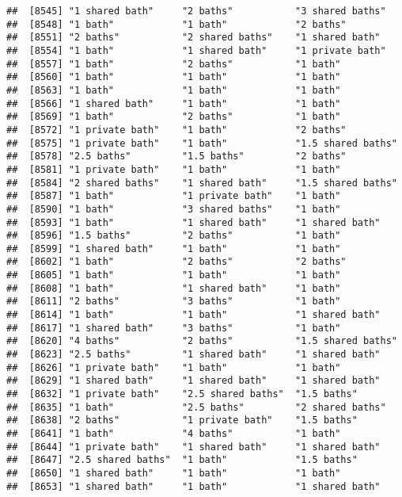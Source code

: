 \documentclass[
]{article}
\begin{document}
\begin{verbatim}
##  [8545] "1 shared bath"     "2 baths"           "3 shared baths"   
##  [8548] "1 bath"            "1 bath"            "2 baths"          
##  [8551] "2 baths"           "2 shared baths"    "1 shared bath"    
##  [8554] "1 bath"            "1 shared bath"     "1 private bath"   
##  [8557] "1 bath"            "2 baths"           "1 bath"           
##  [8560] "1 bath"            "1 bath"            "1 bath"           
##  [8563] "1 bath"            "1 bath"            "1 bath"           
##  [8566] "1 shared bath"     "1 bath"            "1 bath"           
##  [8569] "1 bath"            "2 baths"           "1 bath"           
##  [8572] "1 private bath"    "1 bath"            "2 baths"          
##  [8575] "1 private bath"    "1 bath"            "1.5 shared baths" 
##  [8578] "2.5 baths"         "1.5 baths"         "2 baths"          
##  [8581] "1 private bath"    "1 bath"            "1 bath"           
##  [8584] "2 shared baths"    "1 shared bath"     "1.5 shared baths" 
##  [8587] "1 bath"            "1 private bath"    "1 bath"           
##  [8590] "1 bath"            "3 shared baths"    "1 bath"           
##  [8593] "1 bath"            "1 shared bath"     "1 shared bath"    
##  [8596] "1.5 baths"         "2 baths"           "1 bath"           
##  [8599] "1 shared bath"     "1 bath"            "1 bath"           
##  [8602] "1 bath"            "2 baths"           "2 baths"          
##  [8605] "1 bath"            "1 bath"            "1 bath"           
##  [8608] "1 bath"            "1 shared bath"     "1 bath"           
##  [8611] "2 baths"           "3 baths"           "1 bath"           
##  [8614] "1 bath"            "1 bath"            "1 shared bath"    
##  [8617] "1 shared bath"     "3 baths"           "1 bath"           
##  [8620] "4 baths"           "2 baths"           "1.5 shared baths" 
##  [8623] "2.5 baths"         "1 shared bath"     "1 shared bath"    
##  [8626] "1 private bath"    "1 bath"            "1 bath"           
##  [8629] "1 shared bath"     "1 shared bath"     "1 shared bath"    
##  [8632] "1 private bath"    "2.5 shared baths"  "1.5 baths"        
##  [8635] "1 bath"            "2.5 baths"         "2 shared baths"   
##  [8638] "2 baths"           "1 private bath"    "1.5 baths"        
##  [8641] "1 bath"            "4 baths"           "1 bath"           
##  [8644] "1 private bath"    "1 shared bath"     "1 shared bath"    
##  [8647] "2.5 shared baths"  "1 bath"            "1.5 baths"        
##  [8650] "1 shared bath"     "1 bath"            "1 bath"           
##  [8653] "1 shared bath"     "1 bath"            "1 shared bath"    

\end{verbatim}
\end{document}
